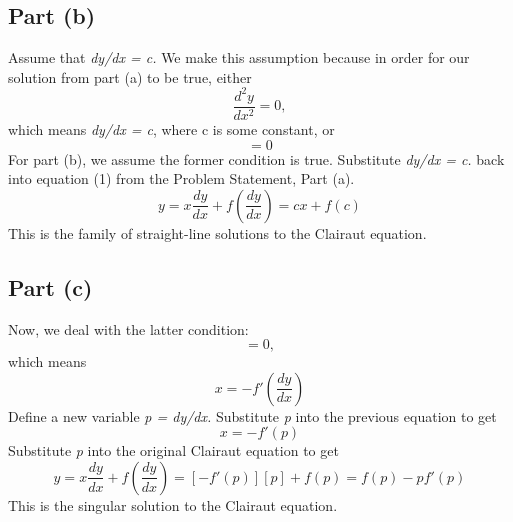 \documentclass{article}
\begin{document}
\subsection{Part (b)}
Assume that \textit{dy/dx = c.} We make this assumption because in order for our solution from part (a) to be true, either  
\begin{equation}
\frac{d^2y}{dx^2} = 0,
\end{equation}
which means \textit{dy/dx = c}, where c is some constant, or
\begin{equation}
[x + f'(\frac{dy}{dx})] = 0
\end{equation}
For part (b), we assume the former condition is true. Substitute \textit{dy/dx = c.} back into equation (1) from the Problem Statement, Part (a).
\begin{equation}
y = x \frac{dy}{dx} + f(\frac{dy}{dx}) = cx + f(c)
\end{equation}
This is the family of straight-line solutions to the Clairaut equation.

\subsection{Part (c)}
Now, we deal with the latter condition:
\begin{equation}
[x + f'(\frac{dy}{dx})] = 0,
\end{equation}
which means 
\begin{equation}
x = -f'(\frac{dy}{dx})
\end{equation}
Define a new variable \textit{p = dy/dx.} Substitute \textit{p} into the previous equation to get
\begin{equation}
x = -f'(p)
\end{equation}
Substitute \textit{p} into the original Clairaut equation to get
\begin{equation}
y = x \frac{dy}{dx} + f(\frac{dy}{dx}) = [-f'(p)][p] + f(p) = f(p) - pf'(p)
\end{equation}
This is the singular solution to the Clairaut equation.
\end{document}
